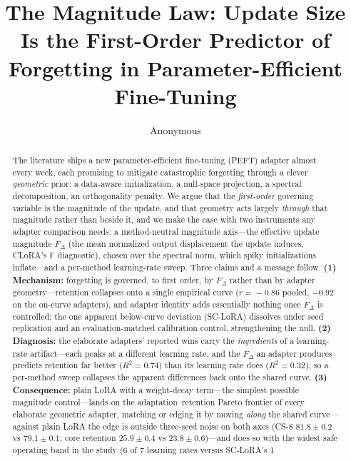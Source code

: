 \documentclass[11pt]{article}
\title{The Magnitude Law: Update Size Is the First-Order Predictor of\\
Forgetting in Parameter-Efficient Fine-Tuning}
\author{Anonymous}
\newcommand{\dw}{F_{\Delta}}
\begin{document}
\maketitle

\begin{abstract}
The literature ships a new parameter-efficient fine-tuning (PEFT) adapter almost
every week, each promising to mitigate catastrophic forgetting through a clever
\emph{geometric} prior: a data-aware initialization, a null-space projection, a
spectral decomposition, an orthogonality penalty. We argue that the
\emph{first-order} governing variable is the magnitude of the update, and that
geometry acts largely \emph{through} that magnitude rather than beside it, and we
make the case with two instruments
any adapter comparison needs: a method-neutral magnitude axis---the effective
update magnitude $\dw$ (the mean normalized output displacement the update induces,
CLoRA's $\mathbb{F}$ diagnostic), chosen over the spectral norm, which spiky
initializations inflate---and a per-method learning-rate sweep. Three claims
and a message follow. \textbf{(1) Mechanism:} forgetting is governed, to first
order, by $\dw$ rather than by adapter geometry---retention collapses onto a single
empirical curve
($r\!=\!-0.86$ pooled, $-0.92$ on the on-curve adapters), and adapter identity adds
essentially nothing once $\dw$ is controlled; the one apparent below-curve
deviation (SC-LoRA) dissolves under seed replication and an evaluation-matched
calibration control, strengthening the null. \textbf{(2) Diagnosis:} the elaborate
adapters' reported wins carry the \emph{ingredients} of a learning-rate
artifact---each peaks at a different learning rate, and the $\dw$ an adapter
produces predicts retention far better ($R^2\!=\!0.74$) than its learning rate does
($R^2\!=\!0.32$), so a per-method sweep collapses the apparent differences back
onto the shared curve. \textbf{(3) Consequence:} plain LoRA with a weight-decay
term---the simplest possible magnitude control---lands on the
adaptation--retention Pareto frontier of every elaborate geometric adapter,
matching or edging it by moving \emph{along} the shared curve---against plain LoRA
the edge is outside three-seed noise on both axes (CS-8 $81.8\!\pm\!0.2$ vs
$79.1\!\pm\!0.1$; core retention $25.9\!\pm\!0.4$ vs $23.8\!\pm\!0.6$)---and does
so with the
widest safe operating band in the study (6 of 7 learning rates versus SC-LoRA's 1

\end{abstract}
\end{document}
